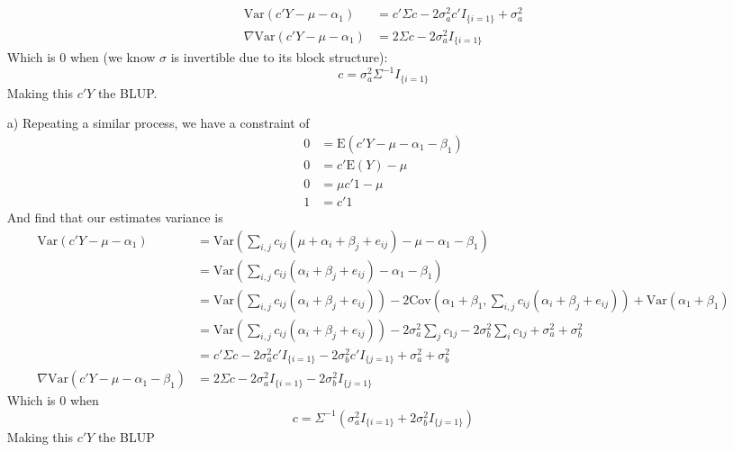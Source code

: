 \documentclass[11pt]{article}
\newcommand{\E}{\mathrm{E}}
\newcommand{\var}{\mathrm{Var}}
\newcommand{\cov}{\mathrm{Cov}}
\theoremstyle{definition}
\begin{document}
\begin{itemize}
            \begin{align*}
                \var(c'Y-\mu-\alpha_1) &= c'\Sigma c -2\sigma_a^2 c'I_{\{i=1\}} + \sigma_a^2 \\
                \nabla \var(c'Y-\mu-\alpha_1) &= 2\Sigma c -2\sigma_a^2 I_{\{i=1\}}
            \end{align*}
            Which is $0$ when (we know $\sigma$ is invertible due to its block structure):
            \[ c = \sigma_a^2\Sigma^{-1} I_{\{i=1\}} \]
            Making this $c'Y$ the BLUP.
    \item[a)]
        Repeating a similar process, we have a constraint of 
        \begin{align*}
            0 &= \E(c'Y-\mu-\alpha_1 -\beta_1) \\
            0 &= c'\E(Y) - \mu \\
            0 &= \mu c'1 - \mu \\
            1 &= c'1
        \end{align*}
        And find that our estimates variance is
        \begin{align*}
            \var(c'Y-\mu-\alpha_1) &= \var\left(\sum_{i,j} c_{ij}(\mu + \alpha_i + \beta_j + e_{ij}) - \mu - \alpha_1 - \beta_1\right) \\
                                   &= \var\left(\sum_{i,j} c_{ij}(      \alpha_i + \beta_j + e_{ij}) -     \alpha_1 - \beta_1\right) \\
                                   &= \var\left(\sum_{i,j} c_{ij}(\alpha_i + \beta_j + e_{ij})\right) -2\cov\left(\alpha_1+\beta_1,\sum_{i,j} c_{ij}(\alpha_i + \beta_j + e_{ij})\right) + \var(\alpha_1 + \beta_1)  \\
                                   &= \var\left(\sum_{i,j} c_{ij}(\alpha_i + \beta_j + e_{ij})\right) -2 \sigma_a^2 \sum_{j} c_{1j} -2\sigma_b^2 \sum_{i} c_{1j}+ \sigma_a^2 + \sigma_b^2 \\
                                   &= c'\Sigma c -2\sigma_a^2 c' I_{\{i=1\}} -2\sigma_b^2 c' I_{\{j=1\}} + \sigma_a^2 + \sigma_b^2 \\
            \nabla \var(c'Y-\mu-\alpha_1-\beta_1) &= 2\Sigma c -2\sigma_a^2 I_{\{i=1\}} -2\sigma_b^2 I_{\{j=1\}}
        \end{align*}
        Which is $0$ when
        \[ c = \Sigma^{-1}(\sigma_a^2 I_{\{i=1\}} + 2\sigma_b^2  I_{\{j=1\}}) \]
        Making this $c'Y$ the BLUP
\end{itemize}
\end{document}
